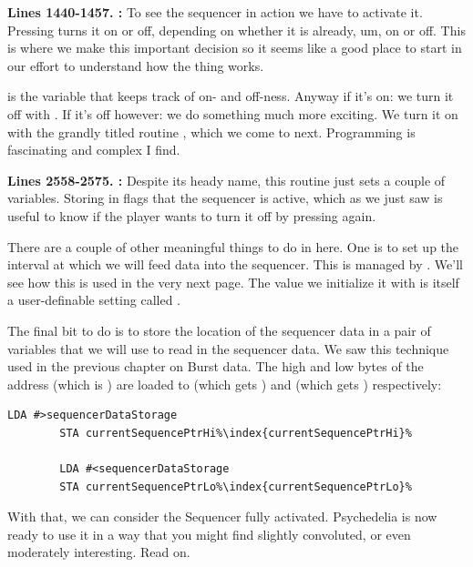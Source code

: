 \textbf{Lines 1440-1457. :} To see the sequencer in action we have to activate it. Pressing  turns it on or off, depending on whether
it is already, um, on or off. This is where we make this important decision so it seems like a good place to start in our effort to understand how the thing works.

  is the variable that keeps track of on- and off-ness. Anyway if it's on: we turn it off
with . If it's off however: we do something much more exciting. We turn it on with the grandly titled routine
, which we come to next. Programming is fascinating and complex I find.

\textbf{Lines 2558-2575. :}  Despite its heady name, this routine just sets a couple of variables.
Storing  in  flags that the sequencer is active, which as we just saw is useful to know if the player wants
to turn it off by pressing  again. 

There are a couple of other meaningful things to do in here. One is to set up the interval at which we will feed data into the sequencer.
This is managed by . We'll see how this is used in the very next page. The value we initialize it
with is itself a user-definable setting called .

The final bit to do is to store the location of the sequencer data in a pair of variables that we will use to read in the sequencer data. We
saw this technique used in the previous chapter on Burst data. The high and low bytes of the address  (which is ) are loaded to 
 (which gets ) and  (which gets ) respectively:
\begin{lstlisting}[escapechar=\%]
        LDA #>sequencerDataStorage
        STA currentSequencePtrHi%\index{currentSequencePtrHi}%

        LDA #<sequencerDataStorage
        STA currentSequencePtrLo%\index{currentSequencePtrLo}%
\end{lstlisting}

With that, we can consider the Sequencer fully activated. Psychedelia is now ready to use it in a way that you might find slightly 
convoluted, or even moderately interesting. Read on.

